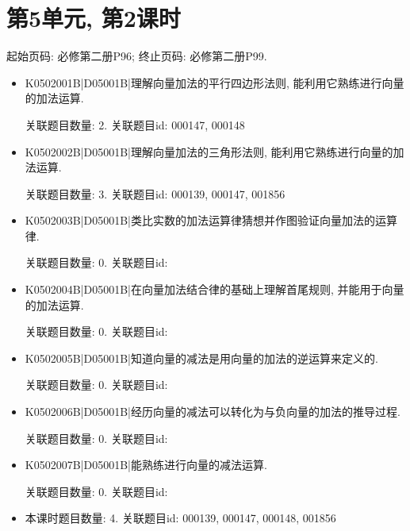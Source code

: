 \section*{第5单元, 第2课时}
起始页码: 必修第二册P96; 终止页码: 必修第二册P99.
\begin{itemize}
\item K0502001B|D05001B|理解向量加法的平行四边形法则, 能利用它熟练进行向量的加法运算.

关联题目数量: 2. 关联题目id: 000147, 000148

\item K0502002B|D05001B|理解向量加法的三角形法则, 能利用它熟练进行向量的加法运算.

关联题目数量: 3. 关联题目id: 000139, 000147, 001856

\item K0502003B|D05001B|类比实数的加法运算律猜想并作图验证向量加法的运算律.

关联题目数量: 0. 关联题目id: 

\item K0502004B|D05001B|在向量加法结合律的基础上理解首尾规则, 并能用于向量的加法运算.

关联题目数量: 0. 关联题目id: 

\item K0502005B|D05001B|知道向量的减法是用向量的加法的逆运算来定义的.

关联题目数量: 0. 关联题目id: 

\item K0502006B|D05001B|经历向量的减法可以转化为与负向量的加法的推导过程.

关联题目数量: 0. 关联题目id: 

\item K0502007B|D05001B|能熟练进行向量的减法运算.

关联题目数量: 0. 关联题目id: 

\item 本课时题目数量: 4. 关联题目id: 000139, 000147, 000148, 001856

\end{itemize}

